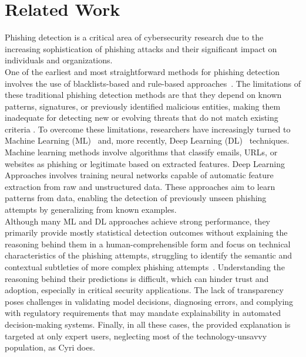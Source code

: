 \section{Related Work}
\label{sec:rel}
Phishing detection is a critical area of cybersecurity research due to the increasing sophistication of phishing attacks and their significant impact on individuals and organizations.\\
One of the earliest and most straightforward methods for phishing detection involves the use of blacklists-based and rule-based approaches~\cite{b2}. The limitations of these traditional phishing detection methods are that they depend on known patterns, signatures, or previously identified malicious entities, making them inadequate for detecting new or evolving threats that do not match existing criteria \cite{b13}.
To overcome these limitations, researchers have increasingly turned to Machine Learning (ML)~\cite{b12, b15, b16, b18} and, more recently, Deep Learning (DL)~\cite{b14, b40} techniques.\\
Machine learning methods involve algorithms that classify emails, URLs, or websites as phishing or legitimate based on extracted features. Deep Learning Approaches involves training neural networks capable of automatic feature extraction from raw and unstructured data. These approaches aim to learn patterns from data, enabling the detection of previously unseen phishing attempts by generalizing from known examples.\\
Although many ML and DL approaches achieve strong performance, they primarily provide mostly statistical detection outcomes without explaining the reasoning behind them in a human-comprehensible form and focus on technical characteristics of the phishing attempts, struggling to identify the semantic and contextual subtleties of more complex phishing attempts~\cite{b24}. Understanding the reasoning behind their predictions is difficult, which can hinder trust and adoption, especially in critical security applications. The lack of transparency poses challenges in validating model decisions, diagnosing errors, and complying with regulatory requirements that may mandate explainability in automated decision-making systems.
Finally, in all these cases, the provided explanation is targeted at only expert users, neglecting most of the technology-unsavvy population, as Cyri does.

